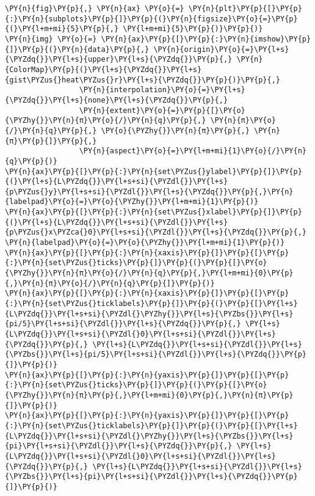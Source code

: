 \begin{Verbatim}[commandchars=\\\{\}]
\PY{n}{fig}\PY{p}{,} \PY{n}{ax} \PY{o}{=} \PY{n}{plt}\PY{p}{[}\PY{p}{:}\PY{n}{subplots}\PY{p}{]}\PY{p}{(}\PY{n}{figsize}\PY{o}{=}\PY{p}{(}\PY{l+m+mi}{5}\PY{p}{,} \PY{l+m+mi}{5}\PY{p}{)}\PY{p}{)}
\PY{n}{img} \PY{o}{=} \PY{n}{ax}\PY{p}{[}\PY{p}{:}\PY{n}{imshow}\PY{p}{]}\PY{p}{(}\PY{n}{data}\PY{p}{,} \PY{n}{origin}\PY{o}{=}\PY{l+s}{\PYZdq{}}\PY{l+s}{upper}\PY{l+s}{\PYZdq{}}\PY{p}{,} \PY{n}{ColorMap}\PY{p}{(}\PY{l+s}{\PYZdq{}}\PY{l+s}{gist\PYZus{}heat\PYZus{}r}\PY{l+s}{\PYZdq{}}\PY{p}{)}\PY{p}{,}
                 \PY{n}{interpolation}\PY{o}{=}\PY{l+s}{\PYZdq{}}\PY{l+s}{none}\PY{l+s}{\PYZdq{}}\PY{p}{,}
                 \PY{n}{extent}\PY{o}{=}\PY{p}{[}\PY{o}{\PYZhy{}}\PY{n}{π}\PY{o}{/}\PY{n}{q}\PY{p}{,} \PY{n}{π}\PY{o}{/}\PY{n}{q}\PY{p}{,} \PY{o}{\PYZhy{}}\PY{n}{π}\PY{p}{,} \PY{n}{π}\PY{p}{]}\PY{p}{,}
                 \PY{n}{aspect}\PY{o}{=}\PY{l+m+mi}{1}\PY{o}{/}\PY{n}{q}\PY{p}{)}
\PY{n}{ax}\PY{p}{[}\PY{p}{:}\PY{n}{set\PYZus{}ylabel}\PY{p}{]}\PY{p}{(}\PY{l+s}{L\PYZdq{}}\PY{l+s+si}{\PYZdl{}}\PY{l+s}{p\PYZus{}y}\PY{l+s+si}{\PYZdl{}}\PY{l+s}{\PYZdq{}}\PY{p}{,}\PY{n}{labelpad}\PY{o}{=}\PY{o}{\PYZhy{}}\PY{l+m+mi}{1}\PY{p}{)}
\PY{n}{ax}\PY{p}{[}\PY{p}{:}\PY{n}{set\PYZus{}xlabel}\PY{p}{]}\PY{p}{(}\PY{l+s}{L\PYZdq{}}\PY{l+s+si}{\PYZdl{}}\PY{l+s}{p\PYZus{}x\PYZca{}0}\PY{l+s+si}{\PYZdl{}}\PY{l+s}{\PYZdq{}}\PY{p}{,} \PY{n}{labelpad}\PY{o}{=}\PY{o}{\PYZhy{}}\PY{l+m+mi}{1}\PY{p}{)}
\PY{n}{ax}\PY{p}{[}\PY{p}{:}\PY{n}{xaxis}\PY{p}{]}\PY{p}{[}\PY{p}{:}\PY{n}{set\PYZus{}ticks}\PY{p}{]}\PY{p}{(}\PY{p}{[}\PY{o}{\PYZhy{}}\PY{n}{π}\PY{o}{/}\PY{n}{q}\PY{p}{,}\PY{l+m+mi}{0}\PY{p}{,}\PY{n}{π}\PY{o}{/}\PY{n}{q}\PY{p}{]}\PY{p}{)}
\PY{n}{ax}\PY{p}{[}\PY{p}{:}\PY{n}{xaxis}\PY{p}{]}\PY{p}{[}\PY{p}{:}\PY{n}{set\PYZus{}ticklabels}\PY{p}{]}\PY{p}{(}\PY{p}{[}\PY{l+s}{L\PYZdq{}}\PY{l+s+si}{\PYZdl{}\PYZhy{}}\PY{l+s}{\PYZbs{}}\PY{l+s}{pi/5}\PY{l+s+si}{\PYZdl{}}\PY{l+s}{\PYZdq{}}\PY{p}{,} \PY{l+s}{L\PYZdq{}}\PY{l+s+si}{\PYZdl{}0}\PY{l+s+si}{\PYZdl{}}\PY{l+s}{\PYZdq{}}\PY{p}{,} \PY{l+s}{L\PYZdq{}}\PY{l+s+si}{\PYZdl{}}\PY{l+s}{\PYZbs{}}\PY{l+s}{pi/5}\PY{l+s+si}{\PYZdl{}}\PY{l+s}{\PYZdq{}}\PY{p}{]}\PY{p}{)}
\PY{n}{ax}\PY{p}{[}\PY{p}{:}\PY{n}{yaxis}\PY{p}{]}\PY{p}{[}\PY{p}{:}\PY{n}{set\PYZus{}ticks}\PY{p}{]}\PY{p}{(}\PY{p}{[}\PY{o}{\PYZhy{}}\PY{n}{π}\PY{p}{,}\PY{l+m+mi}{0}\PY{p}{,}\PY{n}{π}\PY{p}{]}\PY{p}{)}
\PY{n}{ax}\PY{p}{[}\PY{p}{:}\PY{n}{yaxis}\PY{p}{]}\PY{p}{[}\PY{p}{:}\PY{n}{set\PYZus{}ticklabels}\PY{p}{]}\PY{p}{(}\PY{p}{[}\PY{l+s}{L\PYZdq{}}\PY{l+s+si}{\PYZdl{}\PYZhy{}}\PY{l+s}{\PYZbs{}}\PY{l+s}{pi}\PY{l+s+si}{\PYZdl{}}\PY{l+s}{\PYZdq{}}\PY{p}{,} \PY{l+s}{L\PYZdq{}}\PY{l+s+si}{\PYZdl{}0}\PY{l+s+si}{\PYZdl{}}\PY{l+s}{\PYZdq{}}\PY{p}{,} \PY{l+s}{L\PYZdq{}}\PY{l+s+si}{\PYZdl{}}\PY{l+s}{\PYZbs{}}\PY{l+s}{pi}\PY{l+s+si}{\PYZdl{}}\PY{l+s}{\PYZdq{}}\PY{p}{]}\PY{p}{)}

\end{Verbatim}
